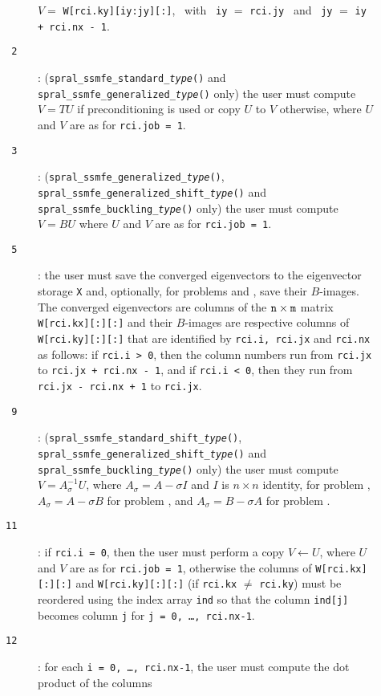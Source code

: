 \begin{description}
\begin{description}
\hspace{8mm}
$V=$ {\tt W[rci.ky][iy:jy][:]},
~with~ {\tt iy} $=$ {\tt rci.jy} 
~and~
{\tt jy} $=$ {\tt iy + rci.nx - 1}.
%
\item[\texttt{~2}]:
({\tt spral\_ssmfe\_standard\_\textit{type}()} and {\tt spral\_ssmfe\_generalized\_\textit{type}()} only)
the user must
compute $V = T U$ if preconditioning is used
or copy $U$ to $V$ otherwise,
where $U$ and $V$ are as for {\tt rci.job = 1}.
%
\item[\texttt{~3}]:
({\tt spral\_ssmfe\_generalized\_\textit{type}()},
 {\tt spral\_ssmfe\_generalized\_shift\_\textit{type}()} and\\
 {\tt spral\_ssmfe\_buckling\_\textit{type}()} only)
the user must compute $V = B U$ 
where $U$ and $V$ are as for {\tt rci.job = 1}.
%
\item[\texttt{~5}]: the user must save the converged eigenvectors
to the eigenvector storage {\tt X}
and, optionally, 
for problems  and ,
save their $B$-images.
The converged eigenvectors are columns of the ${\tt n}\times {\tt m}$ matrix
{\tt W[rci.kx][:][:]} and their $B$-images are respective columns of
{\tt W[rci.ky][:][:]}
that are identified by
{\tt rci.i, rci.jx} and {\tt rci.nx}
as follows:
if {\tt rci.i > 0}, then the column numbers
run from {\tt rci.jx} to {\tt rci.jx + rci.nx - 1},
and if {\tt rci.i < 0}, then they run
from {\tt rci.jx - rci.nx + 1} to {\tt rci.jx}.
%
\item[\texttt{~9}]:
({\tt spral\_ssmfe\_standard\_shift\_\textit{type}()},
 {\tt spral\_ssmfe\_generalized\_shift\_\textit{type}()} and\\
 {\tt spral\_ssmfe\_buckling\_\textit{type}()} only)
the user must compute $V = A_\sigma^{-1} U$, where
$A_\sigma = A - \sigma I$
and $I$ is $n\times n$ identity,
for problem , 
$A_\sigma = A - \sigma B$ for problem ,
and 
$A_\sigma = B - \sigma A$ for problem .
%
\item[\texttt{11}]:
if {\tt rci.i = 0}, then
the user  must perform a copy $V \leftarrow U$, 
where $U$ and $V$ are as for {\tt rci.job = 1},
otherwise the columns of {\tt W[rci.kx][:][:]}
and {\tt W[rci.ky][:][:]}
(if {\tt rci.kx} $\not=$ {\tt rci.ky}) 
must be reordered using
the index array {\tt ind} so that %
the column {\tt ind[j]} becomes column {\tt j}
for {\tt j = 0, \ldots, rci.nx-1}.
%
\item[\texttt{12}]:
for each
{\tt i = 0, \ldots, rci.nx-1}, 
the user must compute the dot product of
the columns 


\end{description}
\end{description}
